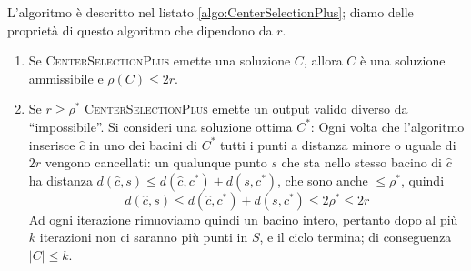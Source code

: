 \noindent
L'algoritmo è descritto nel listato \ref{algo:CenterSelectionPlus};
diamo delle proprietà di questo algoritmo che dipendono da $r$.
\begin{enumerate}
	\item Se \textsc{CenterSelectionPlus} emette una soluzione $C$, allora $C$ è una
	      soluzione ammissibile e $\rho(C) \leq 2r$.
	\item Se $r \geq \rho^*$ \textsc{CenterSelectionPlus} emette un output valido
	      diverso da ``impossibile''. Si consideri una soluzione ottima $C^*$:
	      Ogni volta che l'algoritmo inserisce $\hat{c}$ in uno dei bacini
	      di $C^*$ tutti i punti a distanza minore o uguale di $2r$
	      vengono cancellati: un qualunque punto $s$ che sta nello stesso bacino di
	      $\hat{c}$ ha distanza $d(\hat{c}, s) \leq d(\hat{c}, c^*) + d(s, c^*)$,
	      che sono anche $\leq \rho^*$, quindi
	      $$
		      d(\hat{c}, s) \leq d(\hat{c}, c^*) + d(s, c^*) \leq 2\rho^* \leq 2r
	      $$
	      Ad ogni iterazione rimuoviamo quindi un bacino intero, pertanto dopo al più $k$
	      iterazioni non ci saranno più punti in $S$, e il ciclo termina; di conseguenza
	      $|C| \leq k$.
\end{enumerate}
